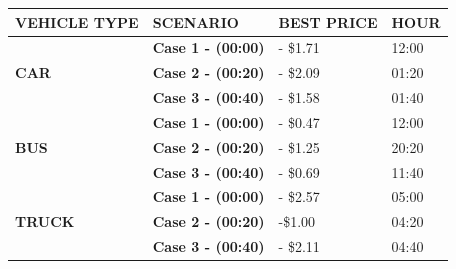 	\begin{table}[!h]
		\begin{tabular}{|l|l|l|l|}
			\hline
			\textbf{VEHICLE TYPE}           & \textbf{SCENARIO}         & \textbf{BEST PRICE} & \textbf{HOUR} \\ \hline
			\multirow{3}{*}{\textbf{CAR}}   & \textbf{Case 1 - (00:00)} & - \$1.71            & 12:00         \\ \cline{2-4} 
			& \textbf{Case 2 - (00:20)} & - \$2.09            & 01:20         \\ \cline{2-4} 
			& \textbf{Case 3 - (00:40)} & - \$1.58            & 01:40         \\ \hline
			\multirow{3}{*}{\textbf{BUS}}   & \textbf{Case 1 - (00:00)} & - \$0.47            & 12:00         \\ \cline{2-4} 
			& \textbf{Case 2 - (00:20)} & - \$1.25            & 20:20         \\ \cline{2-4} 
			& \textbf{Case 3 - (00:40)} & - \$0.69            & 11:40         \\ \hline
			\multirow{3}{*}{\textbf{TRUCK}} & \textbf{Case 1 - (00:00)} & - \$2.57            & 05:00         \\ \cline{2-4} 
			& \textbf{Case 2 - (00:20)} & -\$1.00             & 04:20         \\ \cline{2-4} 
			& \textbf{Case 3 - (00:40)} & - \$2.11            & 04:40         \\ \hline
		\end{tabular}
	\end{table}
	

